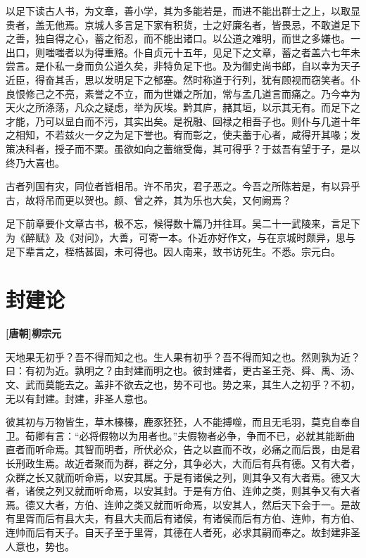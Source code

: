 \documentclass[UTF8,titlepage,oneside]{ctexbook}
\begin{document}
以足下读古人书，为文章，善小学，其为多能若是，而进不能出群士之上，以取显贵者，盖无他焉。京城人多言足下家有积货，士之好廉名者，皆畏忌，不敢道足下之善，独自得之心，蓄之衔忍，而不能出诸口。以公道之难明，而世之多嫌也。一出口，则嗤嗤者以为得重赂。仆自贞元十五年，见足下之文章，蓄之者盖六七年未尝言。是仆私一身而负公道久矣，非特负足下也。及为御史尚书郎，自以幸为天子近臣，得奋其舌，思以发明足下之郁塞。然时称道于行列，犹有顾视而窃笑者。仆良恨修己之不亮，素誉之不立，而为世嫌之所加，常与孟几道言而痛之。乃今幸为天火之所涤荡，凡众之疑虑，举为灰埃。黔其庐，赭其垣，以示其无有。而足下之才能，乃可以显白而不污，其实出矣。是祝融、回禄之相吾子也。则仆与几道十年之相知，不若兹火一夕之为足下誉也。宥而彰之，使夫蓄于心者，咸得开其喙；发策决科者，授子而不栗。虽欲如向之蓄缩受侮，其可得乎？于兹吾有望于子，是以终乃大喜也。

古者列国有灾，同位者皆相吊。许不吊灾，君子恶之。今吾之所陈若是，有以异乎古，故将吊而更以贺也。颜、曾之养，其为乐也大矣，又何阙焉？

足下前章要仆文章古书，极不忘，候得数十篇乃并往耳。吴二十一武陵来，言足下为《醉赋》及《对问》，大善，可寄一本。仆近亦好作文，与在京城时颇异，思与足下辈言之，桎梏甚固，未可得也。因人南来，致书访死生。不悉。宗元白。


\chapter*{封建论}
\begin{center}
	\textbf{[唐朝]柳宗元}
\end{center}


天地果无初乎？吾不得而知之也。生人果有初乎？吾不得而知之也。然则孰为近？曰：有初为近。孰明之？由封建而明之也。彼封建者，更古圣王尧、舜、禹、汤、文、武而莫能去之。盖非不欲去之也，势不可也。势之来，其生人之初乎？不初，无以有封建。封建，非圣人意也。


彼其初与万物皆生，草木榛榛，鹿豕狉狉，人不能搏噬，而且无毛羽，莫克自奉自卫。荀卿有言：“必将假物以为用者也。”夫假物者必争，争而不已，必就其能断曲直者而听命焉。其智而明者，所伏必众，告之以直而不改，必痛之而后畏，由是君长刑政生焉。故近者聚而为群，群之分，其争必大，大而后有兵有德。又有大者，众群之长又就而听命焉，以安其属。于是有诸侯之列，则其争又有大者焉。德又大者，诸侯之列又就而听命焉，以安其封。于是有方伯、连帅之类，则其争又有大者焉。德又大者，方伯、连帅之类又就而听命焉，以安其人，然后天下会于一。是故有里胥而后有县大夫，有县大夫而后有诸侯，有诸侯而后有方伯、连帅，有方伯、连帅而后有天子。自天子至于里胥，其德在人者死，必求其嗣而奉之。故封建非圣人意也，势也。
\end{document}
